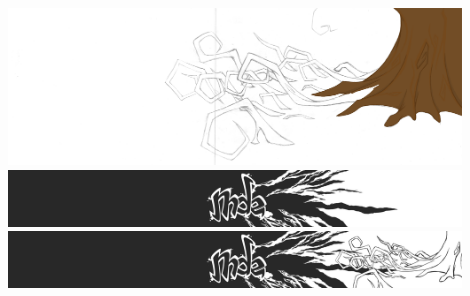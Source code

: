         \includegraphics[width=0.9\textwidth]{img/arbre.png}
        \includegraphics[width=0.9\textwidth]{img/mde.png}
        \includegraphics[width=0.9\textwidth]{img/mde+arbre.png}
            
